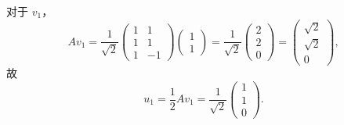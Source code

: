 \begin{solution}
\begin{enumerate}
              对于 $ v_1 $，
              \[
                  Av_1
                  =
                  \frac{1}{\sqrt{2}}
                  \begin{pmatrix}
                      1 & 1  \\
                      1 & 1  \\
                      1 & -1
                  \end{pmatrix}
                  \begin{pmatrix}
                      1 \\
                      1
                  \end{pmatrix}
                  =
                  \frac{1}{\sqrt{2}}
                  \begin{pmatrix}
                      2 \\
                      2 \\
                      0
                  \end{pmatrix}
                  =
                  \begin{pmatrix}
                      \sqrt{2} \\
                      \sqrt{2} \\
                      0
                  \end{pmatrix},
              \]
              故
              \[
                  u_1 = \frac{1}{2}Av_1
                  =
                  \frac{1}{\sqrt{2}}
                  \begin{pmatrix}
                      1 \\
                      1 \\
                      0
                  \end{pmatrix}.
              \]


\end{enumerate}
\end{solution}
